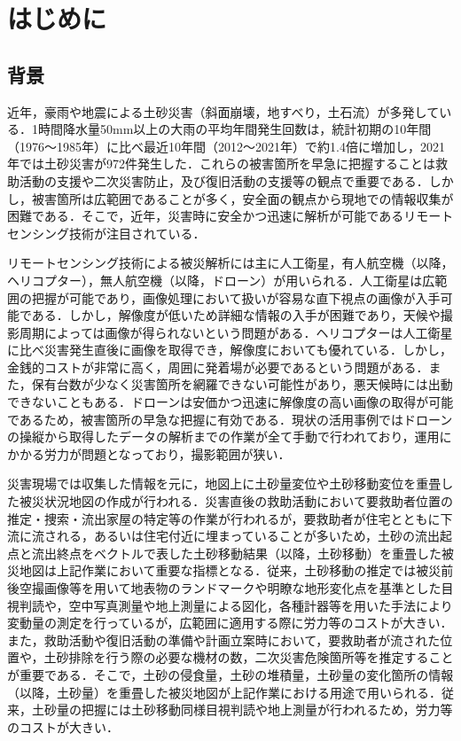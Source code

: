 \chapter{はじめに}
  \section{背景}
    近年，豪雨や地震による土砂災害（斜面崩壊，地すべり，土石流）が多発している．1時間降水量50mm以上の大雨の平均年間発生回数は，統計初期の10年間（1976〜1985年）に比べ最近10年間（2012〜2021年）で約1.4倍に増加し，2021年では土砂災害が972件発生した\cite{背景1, 背景2}．これらの被害箇所を早急に把握することは救助活動の支援や二次災害防止，及び復旧活動の支援等の観点で重要である．しかし，被害箇所は広範囲であることが多く，安全面の観点から現地での情報収集が困難である\cite{背景3}．そこで，近年，災害時に安全かつ迅速に解析が可能であるリモートセンシング技術が注目されている\cite{背景4}．

    リモートセンシング技術による被災解析には主に人工衛星，有人航空機（以降，ヘリコプター），無人航空機（以降，ドローン）が用いられる．人工衛星は広範囲の把握が可能であり，画像処理において扱いが容易な直下視点の画像が入手可能である．しかし，解像度が低いため詳細な情報の入手が困難であり，天候や撮影周期によっては画像が得られないという問題がある．ヘリコプターは人工衛星に比べ災害発生直後に画像を取得でき，解像度においても優れている．しかし，金銭的コストが非常に高く，周囲に発着場が必要であるという問題がある．また，保有台数が少なく災害箇所を網羅できない可能性があり，悪天候時には出動できないこともある．ドローンは安価かつ迅速に解像度の高い画像の取得が可能であるため，被害箇所の早急な把握に有効である．現状の活用事例ではドローンの操縦から取得したデータの解析までの作業が全て手動で行われており，運用にかかる労力が問題となっており，撮影範囲が狭い\cite{背景5, 背景6, 背景7}．

    災害現場では収集した情報を元に，地図上に土砂量変位や土砂移動変位を重畳した被災状況地図の作成が行われる．災害直後の救助活動において要救助者位置の推定・捜索・流出家屋の特定等の作業が行われるが，要救助者が住宅とともに下流に流される，あるいは住宅付近に埋まっていることが多いため，土砂の流出起点と流出終点をベクトルで表した土砂移動結果（以降，土砂移動）を重畳した被災地図は上記作業において重要な指標となる．従来，土砂移動の推定では被災前後空撮画像等を用いて地表物のランドマークや明瞭な地形変化点を基準とした目視判読や，空中写真測量や地上測量による図化，各種計器等を用いた手法により変動量の測定を行っているが，広範囲に適用する際に労力等のコストが大きい\cite{土砂移動解析背景1, 土砂移動解析背景2}．また，救助活動や復旧活動の準備や計画立案時において，要救助者が流された位置や，土砂排除を行う際の必要な機材の数，二次災害危険箇所等を推定することが重要である．そこで，土砂の侵食量，土砂の堆積量，土砂量の変化箇所の情報（以降，土砂量）を重畳した被災地図が上記作業における用途で用いられる．従来，土砂量の把握には土砂移動同様目視判読や地上測量が行われるため，労力等のコストが大きい\cite{土砂量解析背景1, 土砂量解析背景2}．



